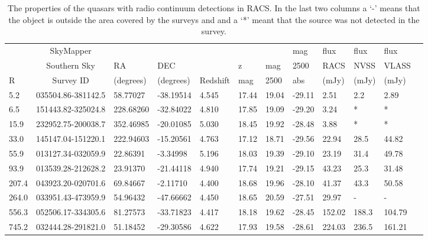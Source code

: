 \documentclass[a4paper,fleqn,usenatbib]{mnras}
\begin{document}
\begin{table*}
\centering
\caption{The properties of the quasars with radio continuum detections in RACS.  In the last two columns a `-' means that the object is outside the area covered by the surveys and and a `*' meant that the source was not detected in the survey. }
\label{tab:quasars}
\begin{tabular}{lcllllllllll} 
\hline

\ & SkyMapper    & \         & \         & \        & \   & \    & mag  & flux  & flux  & flux \\
\ & Southern Sky & RA        & DEC       & \        & z   & mag  & 2500 & RACS  & NVSS  & VLASS \\
R & Survey ID    & (degrees) & (degrees) & Redshift & mag & 2500 & abs  & (mJy) & (mJy) & (mJy) \\             

\hline

  5.2 & 035504.86-381142.5 &  58.77027 & -38.19514 &   4.545 &   17.44 &   19.04 &  -29.11 &    2.51 & 2.2 & 2.89 \\ 
  6.5 & 151443.82-325024.8 & 228.68260 & -32.84022 &   4.810 &   17.85 &   19.09 &  -29.20 &    3.24 & * & * \\ 
 15.9 & 232952.75-200038.7 & 352.46985 & -20.01085 &   5.030 &   18.45 &   19.92 &  -28.48 &    3.88 & * & * \\ 
 33.0 & 145147.04-151220.1 & 222.94603 & -15.20561 &   4.763 &   17.12 &   18.71 &  -29.56 &   22.94 & 28.5 & 44.82 \\ 
 55.9 & 013127.34-032059.9 &  22.86391 &  -3.34998 &   5.196 &   18.03 &   19.39 &  -29.10 &   23.19 & 31.4 & 49.78 \\ 
 93.9 & 013539.28-212628.2 &  23.91370 & -21.44118 &   4.940 &   17.74 &   19.21 &  -29.15 &   43.23 & 25.3 & 31.48 \\ 
207.4 & 043923.20-020701.6 &  69.84667 &  -2.11710 &   4.400 &   18.68 &   19.96 &  -28.10 &   41.37 & 43.3 & 50.58 \\ 
264.0 & 033951.43-473959.9 &  54.96432 & -47.66662 &   4.450 &   18.65 &   20.59 &  -27.51 &   29.97 & - & - \\ 
556.3 & 052506.17-334305.6 &  81.27573 & -33.71823 &   4.417 &   18.18 &   19.62 &  -28.45 &  152.02 & 188.3 & 104.79 \\ 
745.2 & 032444.28-291821.0 &  51.18452 & -29.30586 &   4.622 &   17.93 &   19.58 &  -28.61 &  224.03 & 236.5 & 161.21 \\ 

\end{tabular}
\end{table*}
\end{document}
